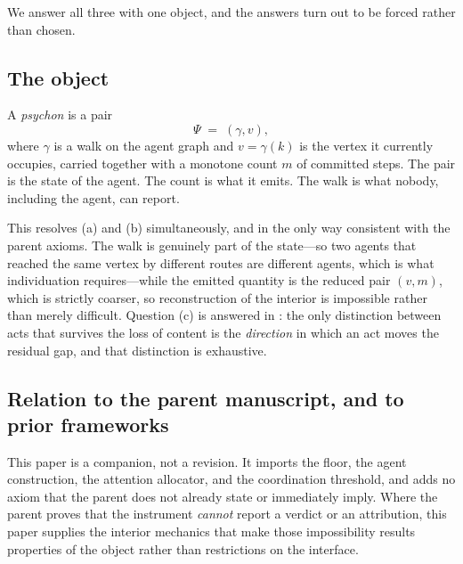 \documentclass[11pt,a4paper]{article}
\theoremstyle{clstyle}
\theoremstyle{definition}
\theoremstyle{remark}
\newcommand{\rec}{m}
\newcommand{\Psy}{\Psi}                  %
\newcommand{\traj}{\gamma}               %
\newcommand{\term}{v}                    %
\begin{document}
We answer all three with one object, and the answers turn out to be forced
rather than chosen.

\subsection{The object}

A \emph{psychon} is a pair
\begin{equation}
\Psy \;=\; (\traj,\term),
\end{equation}
where $\traj$ is a walk on the agent graph and $\term=\traj(k)$ is the
vertex it currently occupies, carried together with a monotone count $\rec$
of committed steps. The pair is the state of the agent. The count is what it
emits. The walk is what nobody, including the agent, can report.

This resolves (a) and (b) simultaneously, and in the only way consistent
with the parent axioms. The walk is genuinely part of the state---so two
agents that reached the same vertex by different routes are different
agents, which is what individuation requires---while the emitted quantity is
the reduced pair $(\term,\rec)$, which is strictly coarser, so reconstruction
of the interior is impossible rather than merely difficult. Question (c) is
answered in : the only distinction between acts that survives
the loss of content is the \emph{direction} in which an act moves the
residual gap, and that distinction is exhaustive.

\subsection{Relation to the parent manuscript, and to prior frameworks}
\label{sec:relation}

This paper is a companion, not a revision. It imports the floor, the agent
construction, the attention allocator, and the coordination threshold, and
adds no axiom that the parent does not already state or immediately imply.
Where the parent proves that the instrument \emph{cannot} report a verdict
or an attribution, this paper supplies the interior mechanics that make
those impossibility results properties of the object rather than
restrictions on the interface.
\end{document}
